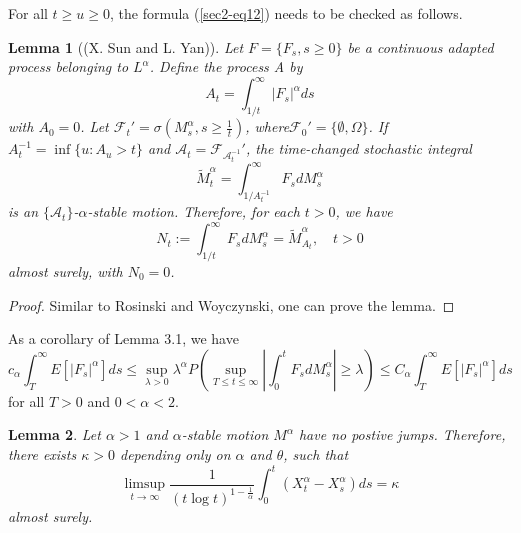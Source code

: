 \documentclass[11pt]{amsart}
\theoremstyle{plain}
\newtheorem{lemma}{Lemma}[section]
\numberwithin{equation}{section}
\begin{document}
For all $t \geq u \geq 0$, the formula (\ref{sec2-eq12}) needs to be checked as follows.
\begin{lemma}[(X. Sun and L. Yan\cite{Yan2})]
Let $F=\{F_s,s\geq 0 \}$ be a continuous adapted process belonging to $L^\alpha$. Define the process A by
\begin{equation*}
A_t = \int_{1/t}^\infty |F_s|^\alpha ds
\end{equation*}
with $A_0=0$. Let $\mathscr{F}_t'=\sigma(M_s^\alpha,s \geq \frac{1}{t})$, where$\mathscr{F}_0'=\{\emptyset,\Omega\}$. If $A_t^{-1}=\inf\{u:A_u>t\}$ and $\mathscr{A}_t=\mathscr{F}_{\mathscr{A}^{-1}_t}'$, the time-changed stochastic integral
$$
\widetilde{M}_t^\alpha=\int_{1/A_t^{-1}}^\infty F_sdM_s^\alpha
$$
is an $\{\mathscr{A}_t\}$-$\alpha$-stable motion. Therefore, for each $t>0$, we have 
\begin{equation*}
N_t:=\int_{1/t}^\infty F_sdM_s^\alpha=\widetilde{M}_{A_t}^\alpha,\quad t>0
\end{equation*}
almost surely, with $N_0=0$.
\end{lemma}

\begin{proof}
Similar to Rosinski and Woyczynski\cite{Rosinski}, one can prove the lemma.
\end{proof}

As a corollary of Lemma 3.1, we have
\begin{equation}\label{sec3-eq12}
c_\alpha\int_T^\infty E[|F_s|^\alpha]ds\leq\sup_{\lambda>0}\lambda^\alpha P\left(\sup_{T\leq t \leq \infty} \left|\int_0^t F_sdM_s^\alpha\right|\geq \lambda\right)\leq C_\alpha\int_T^\infty E[|F_s|^\alpha]ds
\end{equation}
for all $T>0$ and $0<\alpha<2$.

\begin{lemma}
Let $\alpha>1$ and $\alpha$-stable motion $M^\alpha$ have no postive jumps. Therefore, there exists $\kappa>0$ depending only on $\alpha$ and $\theta$, such that
\begin{equation}\label{sec3-eq13}
\limsup_{t\rightarrow \infty}\frac{1}{(t\log t)^{1-\frac{1}{\alpha}}}\int_0^t \left(X_t^\alpha-X_s^\alpha\right)ds=\kappa
\end{equation}
almost surely.
\end{lemma}
\end{document}

